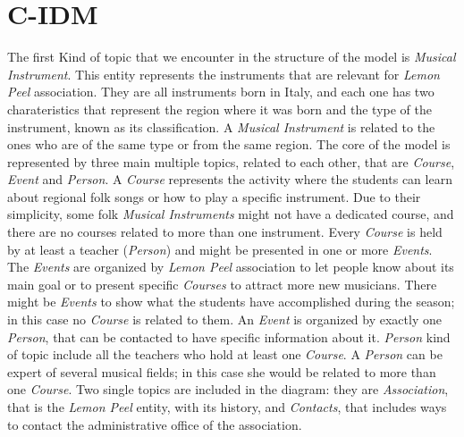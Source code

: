 \documentclass[../../DD.tex]{subfiles}
\begin{document}
\section{C-IDM}
	The first Kind of topic that we encounter in the structure of the model is \textit{Musical Instrument}. This entity represents the instruments that are relevant for \textit{Lemon Peel} association. They are all instruments born in Italy, and each one has two charateristics that represent the region where it was born and the type of the instrument, known as its classification. A \textit{Musical Instrument} is related to the ones who are of the same type or from the same region.
	\newline
	The core of the model is represented by three main multiple topics, related to each other, that are \textit{Course}, \textit{Event} and \textit{Person}. A \textit{Course} represents the activity where the students can learn about regional folk songs or how to play a specific instrument. Due to their simplicity, some folk \textit{Musical Instruments} might not have a dedicated course, and there are no courses related to more than one instrument. Every \textit{Course} is held by at least a teacher (\textit{Person}) and might be presented in one or more \textit{Events}.
	\newline
	The \textit{Events} are organized by \textit{Lemon Peel} association to let people know about its main goal or to present specific \textit{Courses} to attract more new musicians. There might be \textit{Events} to show what the students have accomplished during the season; in this case no \textit{Course} is related to them. An \textit{Event} is organized by exactly one \textit{Person}, that can be contacted to have specific information about it. 
	\newline
	\textit{Person} kind of topic include all the teachers who hold at least one \textit{Course}. A \textit{Person} can be expert of several musical fields; in this case she would be related to more than one \textit{Course}.
	\newline
	Two single topics are included in the diagram: they are \textit{Association}, that is the \textit{Lemon Peel} entity, with its history, and \textit{Contacts}, that includes ways to contact the administrative office of the association.
	\newline
\end{document}
